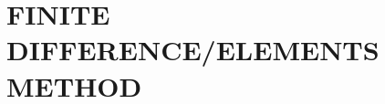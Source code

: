 \documentclass{book}
\begin{document}










\section{FINITE DIFFERENCE/ELEMENTS METHOD}









%

%

%

%


\end{document}
